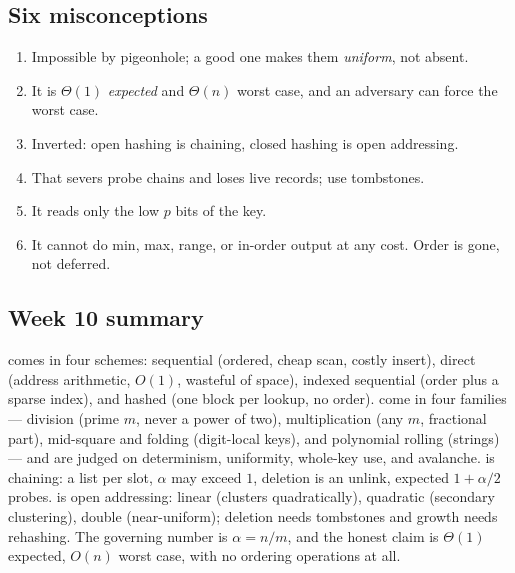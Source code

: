 \documentclass[11pt]{article}
\begin{document}
\subsection{Six misconceptions}

\begin{enumerate}
  \item {} Impossible by pigeonhole; a good one makes them \emph{uniform}, not absent.
  \item {} It is $\Theta(1)$ \emph{expected} and $\Theta(n)$ worst case, and an adversary can force the worst case.
  \item {} Inverted: open hashing is chaining, closed hashing is open addressing.
  \item {} That severs probe chains and loses live records; use tombstones.
  \item {} It reads only the low $p$ bits of the key.
  \item {} It cannot do min, max, range, or in-order output at any cost. Order is gone, not deferred.
\end{enumerate}

\subsection{Week 10 summary}

 comes in four schemes: sequential (ordered, cheap scan, costly insert), direct (address arithmetic, $O(1)$, wasteful of space), indexed sequential (order plus a sparse index), and hashed (one block per lookup, no order).  come in four families --- division (prime $m$, never a power of two), multiplication (any $m$, fractional part), mid-square and folding (digit-local keys), and polynomial rolling (strings) --- and are judged on determinism, uniformity, whole-key use, and avalanche.  is chaining: a list per slot, $\alpha$ may exceed $1$, deletion is an unlink, expected $1 + \alpha/2$ probes.  is open addressing: linear (clusters quadratically), quadratic (secondary clustering), double (near-uniform); deletion needs tombstones and growth needs rehashing. The governing number is $\alpha = n/m$, and the honest claim is $\Theta(1)$ expected, $O(n)$ worst case, with no ordering operations at all.
\end{document}
